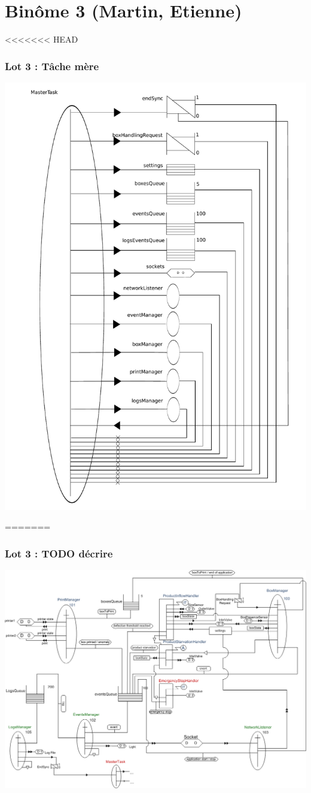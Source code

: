 \documentclass{beamer}
\begin{document}
\section{Binôme 3 (Martin, Etienne)}
	\begin{frame}
<<<<<<< HEAD
	\begin{center}
		\frametitle{Lot 3 : Tâche mère}
		\includegraphics[height=0.8\textheight]{../../SchemasLCG/masterTask.pdf}
	\end{center}
=======
	    \begin{center}
		    \frametitle{Lot 3 : TODO décrire}
		    \includegraphics[height=0.8\textheight]{../../SchemasLCG/schemaGlobal.png}

\end{center}
\end{frame}
\end{document}
